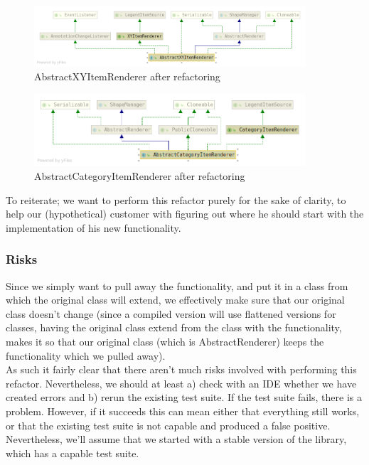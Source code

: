 \documentclass{article}
\begin{document}
\begin{figure}[H]
\centering
	\includegraphics[width=0.9\textwidth]{AbstractXYItemRendererAfter.png}
	\caption{AbstractXYItemRenderer after refactoring}
\end{figure}

\begin{figure}[H]
\centering
	\includegraphics[width=0.9\textwidth]{AbstractCategoryItemRendererAfter.png}
	\caption{AbstractCategoryItemRenderer after refactoring}
\end{figure}

To reiterate; we want to perform this refactor purely for the sake of clarity, to help our (hypothetical) customer with figuring out where he should start with the implementation of his new functionality.

\subsubsection{Risks}

Since we simply want to pull away the functionality, and put it in a class from which the original class will extend, we effectively make sure that our original class doesn't change (since a compiled version will use flattened versions for classes, having the original class extend from the class with the functionality, makes it so that our original class (which is AbstractRenderer) keeps the functionality which we pulled away).\\

As such it fairly clear that there aren't much risks involved with performing this refactor. Nevertheless, we should at least a) check with an IDE whether we have created errors and b) rerun the existing test suite. If the test suite fails, there is a problem. However, if it succeeds this can mean either that everything still works, or that the existing test suite is not capable and produced a false positive. Nevertheless, we'll assume that we started with a stable version of the library, which has a capable test suite.
\end{document}

